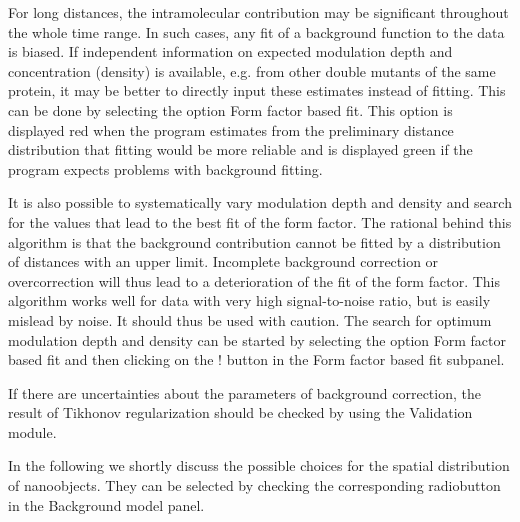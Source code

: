 \documentclass{article}
\begin{document}
For long distances, the intramolecular contribution may be significant throughout the whole time range. In such cases, any fit of a background function to the data is biased. If independent information on expected modulation depth and concentration (density) is available, e.g. from other double mutants of the same protein, it may be better to directly input these estimates instead of fitting. This can be done by selecting the option {\ttfamily Form factor based fit}. This option is displayed red when the program estimates from the preliminary distance distribution that fitting would be more reliable and is displayed green if the program expects problems with background fitting. 

It is also possible to systematically vary modulation depth and density and search for the values that lead to the best fit of the form factor. The rational behind this algorithm is that the background contribution cannot be fitted by a distribution of distances with an upper limit. Incomplete background correction or overcorrection will thus lead to a deterioration of the fit of the form factor. This algorithm works well for data with very high signal-to-noise ratio, but is easily mislead by noise. It should thus be used with caution. The search for optimum modulation depth and density can be started by selecting the option {\ttfamily Form factor based fit} and then clicking on the {\ttfamily !} button in the {\ttfamily Form factor based fit} subpanel.

If there are uncertainties about the parameters of background correction, the result of Tikhonov regularization should be checked by using the {\ttfamily Validation} module. 

In the following we shortly discuss the possible choices for the spatial distribution
of nanoobjects. They can be selected by checking the corresponding radiobutton in the {\ttfamily Background model} panel.
\end{document}
